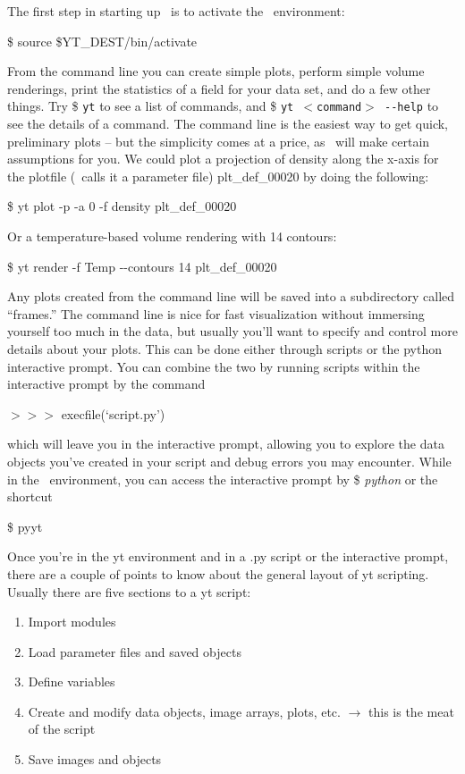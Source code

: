 The first step in starting up \yt\ is to activate the \yt\ environment:

\$ source \$YT\_DEST/bin/activate

From the command line you can create simple plots, perform simple
volume renderings, print the statistics of a field for your data set,
and do a few other things. Try {\$ \tt yt} to see a list of commands,
and {\$ \tt yt {\footnotesize$<$}command{\footnotesize$>$} -{}-help}
to see the details of a command. The command line is the easiest way
to get quick, preliminary plots -- but the simplicity comes at a
price, as \yt\ will make certain assumptions for you. We could plot a
projection of density along the x-axis for the plotfile (\yt\ calls it a
parameter file) plt\_def\_00020 by doing the following:

\$ yt plot -p -a 0 -f density plt\_def\_00020

Or a temperature-based volume rendering with 14 contours:

\$ yt render -f Temp -{}-contours 14 plt\_def\_00020

Any plots created from the command line will be saved into a
subdirectory called ``frames.'' The command line is nice for fast
visualization without immersing yourself too much in the data, but
usually you'll want to specify and control more details about your
plots. This can be done either through scripts or the python
interactive prompt. You can combine the two by running scripts within
the interactive prompt by the command

{\scriptsize$>>>$} execfile(`script.py')

which will leave you in the interactive prompt, allowing you to
explore the data objects you've created in your script and debug
errors you may encounter. While in the \yt\ environment, you can access
the interactive prompt by {\$ \it python} or the shortcut

\$ pyyt

Once you're in the yt environment and in a .py script or the
interactive prompt, there are a couple of points to know about the
general layout of yt scripting. Usually there are five sections to a
yt script:
\begin{enumerate}
\item
\indent Import modules
\item
\indent Load parameter files and saved objects
\item
\indent Define variables
\item
\indent Create and modify data objects, image arrays, plots,
etc. $\rightarrow$ this is the meat of the script
\item
\indent Save images and objects
\end{enumerate}

